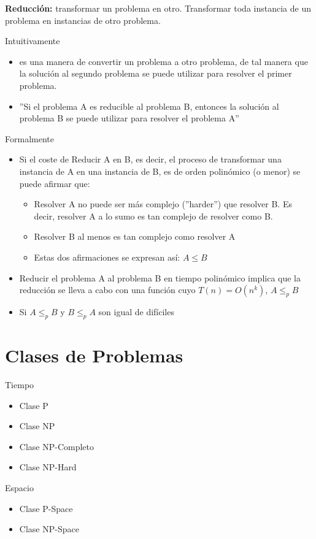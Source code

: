 \textbf{Reducción:} transformar un problema en otro. Transformar toda instancia de un problema en instancias de otro problema.

Intuitivamente
\begin{itemize}
  \item es una manera de convertir un problema a otro problema, de tal manera que la solución al segundo problema se puede utilizar para resolver el primer problema.
  \item ''Si el problema A es reducible al problema B, entonces la solución al problema B se
  puede utilizar para resolver el problema A''
\end{itemize}

Formalmente
\begin{itemize}
  \item Si el coste de Reducir A en B, es decir, el proceso de transformar una instancia de A en una instancia de B, es de orden polinómico (o menor) se puede afirmar que:
  \begin{itemize}
    \item Resolver A no puede ser más complejo (''harder'') que resolver B. Es decir, resolver A a lo sumo es tan complejo de resolver como B.
    \item Resolver B al menos es tan complejo como resolver A
    \item Estas dos afirmaciones se expresan así: $A \leq B$
  \end{itemize}
  \item Reducir el problema A al problema B en tiempo polinómico implica que la reducción se lleva a cabo con una función cuyo $T(n)=O(n^k)$, $A \leq_p B$
  \item Si $A \leq_p B$ y $B \leq_p A$ son igual de difíciles
\end{itemize}

\section{Clases de Problemas}
Tiempo
\begin{itemize}
  \item Clase P
  \item Clase NP
  \item Clase NP-Completo 
  \item Clase NP-Hard
\end{itemize}

Espacio
\begin{itemize}
  \item Clase P-Space
  \item Clase NP-Space
\end{itemize}

